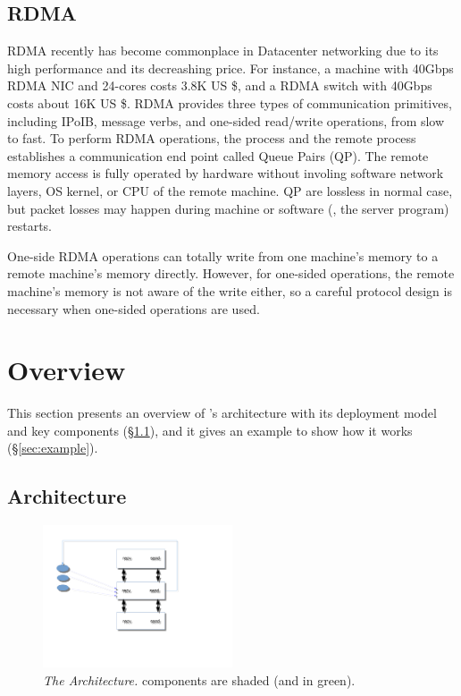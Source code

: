 \subsection{RDMA}\label{sec:rdma}
RDMA recently has become commonplace in Datacenter networking due to its high 
performance and its decreashing price. For instance, a machine with 40Gbps RDMA 
NIC and 24-cores costs 3.8K US \$, and a RDMA switch with 40Gbps costs about 
16K US \$. RDMA provides three types of communication primitives, including 
IPoIB, message verbs, and one-sided read/write operations, from slow to fast. To 
perform RDMA operations, the process and the remote process establishes a 
communication end point called Queue Pairs (QP). The remote memory access is 
fully operated by hardware without involing software network layers, OS kernel, 
or CPU of the remote machine. QP are lossless in normal case, but packet losses 
may happen during machine or software (\eg, the server program) restarts.

One-side RDMA operations can totally write from one machine's memory to a 
remote machine's memory directly. However, for one-sided operations, the remote 
machine's memory is not aware of the write either, so a careful protocol design 
is necessary when one-sided operations are used.


\section{\xxx Overview}\label{sec:overview}

This section presents an overview of \xxx's architecture with its deployment 
model and key components (\S\ref{sec:arch}), and it gives an example to show 
how it works (\S\ref{sec:example}).

\subsection{Architecture}\label{sec:arch}

\begin{figure}[!htb]
\centering
\includegraphics[width=0.5\textwidth]{figures/arch}
\vspace{-.10in}
\caption{{\em The \xxx Architecture.} \rm {\xxx components are shaded (and in
  green).}} \label{fig:arch}
\vspace{-.05in}
\end{figure}


